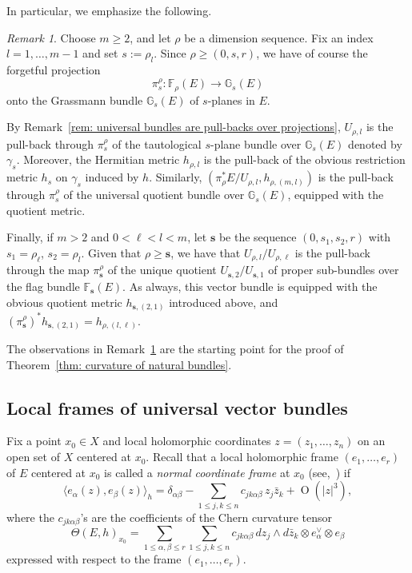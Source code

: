 \documentclass[a4paper]{amsart}
\theoremstyle{plain}%
\theoremstyle{definition}
\theoremstyle{remark}
\newtheorem{remark}[theorem]{Remark}
\newcommand{\GG}{\mathbb{G}}
\newcommand{\FF}{\mathbb{F}}
\begin{document}
In particular, we emphasize the following.
\begin{remark}\label{rem: reduces to grassmannian}
	Choose $ m \ge 2 $, and let $ \rho $ be a dimension sequence.
	Fix an index $ l = 1,\dots,m-1 $ and set $ s := \rho_l $.
	Since $ \rho \ge (0, s ,r) $, we have of course the forgetful projection
	\[
	\pi_{s}^{\rho} \colon \FF_{\rho}(E) \to \GG_{s}(E)
	\]
	onto the Grassmann bundle $ \GG_{s}(E) $ of $ s $-planes in $ E $.
	
	By Remark~\ref{rem: universal bundles are pull-backs over projections}, $ U_{\rho,l} $ is the pull-back through $ \pi_{s}^{\rho} $ of the tautological $ s $-plane bundle over $ \GG_{s}(E) $ denoted by $ \gamma_{s} $.
	Moreover, the Hermitian metric $ h_{\rho,l} $ is the pull-back of the obvious restriction metric $ h_s $ on $ \gamma_{s} $ induced by $ h $.
	Similarly, $ (\pi_{\rho}^{*}E / U_{\rho,l},h_{\rho,(m,l)}) $ is the pull-back through $ \pi_{s}^{\rho} $ of the universal quotient bundle over $ \GG_{s}(E) $, equipped with the quotient metric.
	
	Finally, if $ m > 2 $ and $ 0 < \ell < l < m $, let $ \mathbf{s} $ be the sequence $ (0,s_1,s_2,r) $ with $ s_1 = \rho_{\ell} $, $ s_2 = \rho_l $.
	Given that $ \rho \ge \mathbf{s} $, we have that $ U_{\rho,l}/U_{\rho,\ell} $ is the pull-back through the map $ \pi_{\mathbf{s}}^{\rho} $ of the unique quotient $ U_{\mathbf{s},2} / U_{\mathbf{s},1} $ of proper sub-bundles over the flag bundle $ \FF_{\mathbf{s}}(E) $.
	As always, this vector bundle is equipped with the obvious quotient metric $ h_{\mathbf{s},(2,1)} $ introduced above, and $ (\pi_{\mathbf{s}}^{\rho})^{*} h_{\mathbf{s},(2,1)} = h_{\rho,(l,\ell)} $.
\end{remark}

The observations in Remark~\ref{rem: reduces to grassmannian} are the starting point for the proof of Theorem~\ref{thm: curvature of natural bundles}.

\subsection{Local frames of universal vector bundles}\label{sect: coordinates flag and frames universal bundles}
Fix a point $ x_0 \in X $ and local holomorphic coordinates $ z = (z_1,\dots,z_n) $ on an open set of $ X $ centered at $ x_0 $.
Recall that a local holomorphic frame $ (e_1,\dots,e_r) $ of $ E $ centered at $ x_0 $ is called a \emph{normal coordinate frame} at $ x_0 $ (see,~\cite[(12.10)~Proposition]{Dem01}) if
\begin{equation*}
	\langle e_{\alpha}(z), e_{\beta}(z) \rangle_h = \delta_{\alpha\beta} - \sum_{1 \le j,k \le n} c_{jk\alpha\beta} \, z_j \bar{z}_k + \operatorname{O}(|z|^3) ,
\end{equation*}
where the $ c_{jk\alpha\beta} $'s are the coefficients of the Chern curvature tensor
\begin{equation*}
	\Theta(E,h)_{x_0} = \sum_{1 \le \alpha,\beta \le r} \sum_{1 \le j,k \le n} c_{jk\alpha\beta} \, dz_j \wedge d\bar{z}_k \otimes e_{\alpha}^{\vee} \otimes e_{\beta}
\end{equation*}
expressed with respect to the frame $ (e_1,\dots,e_r) $.
\end{document}
